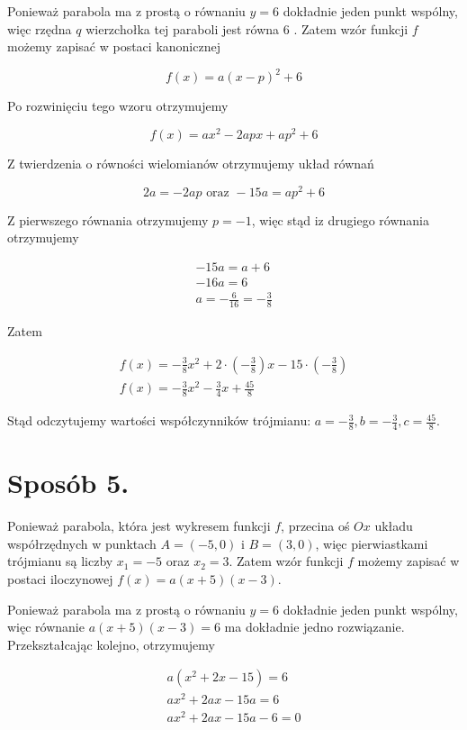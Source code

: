 \documentclass[10pt]{article}
\begin{document}
Ponieważ parabola ma z prostą o równaniu $y=6$ dokładnie jeden punkt wspólny, więc rzędna $q$ wierzchołka tej paraboli jest równa 6 . Zatem wzór funkcji $f$ możemy zapisać w postaci kanonicznej

$$
f(x)=a(x-p)^{2}+6
$$

Po rozwinięciu tego wzoru otrzymujemy

$$
f(x)=a x^{2}-2 a p x+a p^{2}+6
$$

Z twierdzenia o równości wielomianów otrzymujemy układ równań

$$
2 a=-2 a p \text { oraz }-15 a=a p^{2}+6
$$

Z pierwszego równania otrzymujemy $p=-1$, więc stąd iz drugiego równania otrzymujemy

$$
\begin{gathered}
-15 a=a+6 \\
-16 a=6 \\
a=-\frac{6}{16}=-\frac{3}{8}
\end{gathered}
$$

Zatem

$$
\begin{gathered}
f(x)=-\frac{3}{8} x^{2}+2 \cdot\left(-\frac{3}{8}\right) x-15 \cdot\left(-\frac{3}{8}\right) \\
f(x)=-\frac{3}{8} x^{2}-\frac{3}{4} x+\frac{45}{8}
\end{gathered}
$$

Stąd odczytujemy wartości współczynników trójmianu: $a=-\frac{3}{8}, b=-\frac{3}{4}, c=\frac{45}{8}$.

\section*{Sposób 5.}
Ponieważ parabola, która jest wykresem funkcji $f$, przecina oś $O x$ układu współrzędnych w punktach $A=(-5,0)$ i $B=(3,0)$, więc pierwiastkami trójmianu są liczby $x_{1}=-5$ oraz $x_{2}=3$. Zatem wzór funkcji $f$ możemy zapisać w postaci iloczynowej $f(x)=a(x+5)(x-3)$.

Ponieważ parabola ma z prostą o równaniu $y=6$ dokładnie jeden punkt wspólny, więc równanie $a(x+5)(x-3)=6$ ma dokładnie jedno rozwiązanie. Przekształcając kolejno, otrzymujemy

$$
\begin{gathered}
a\left(x^{2}+2 x-15\right)=6 \\
a x^{2}+2 a x-15 a=6 \\
a x^{2}+2 a x-15 a-6=0
\end{gathered}
$$
\end{document}
